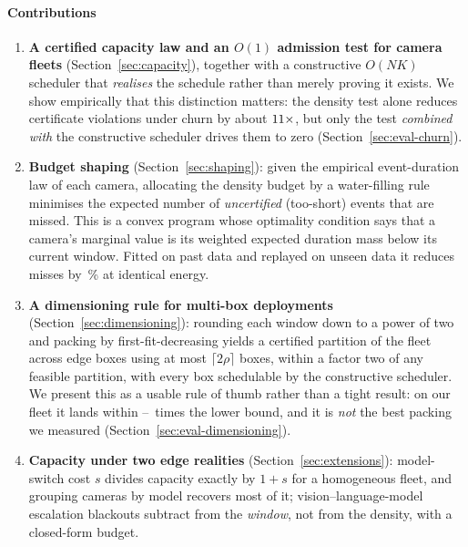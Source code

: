 \documentclass[preprint,review,12pt]{elsarticle}
\theoremstyle{definition}
\newcommand{\Nc}{N}
\newcommand{\dens}{\rho}
\begin{document}
\paragraph{Contributions}
\begin{enumerate}
\item \textbf{A certified capacity law and an $O(1)$ admission test for camera fleets}
      (Section~\ref{sec:capacity}), together with a constructive $O(\Nc K)$ scheduler that
      \emph{realises} the schedule rather than merely proving it exists. We show empirically that
      this distinction matters: the density test alone reduces certificate violations under churn
      by about $11\times$, but only the test \emph{combined with} the constructive
      scheduler drives them to zero (Section~\ref{sec:eval-churn}).
\item \textbf{Budget shaping} (Section~\ref{sec:shaping}): given the empirical event-duration law
      of each camera, allocating the density budget by a water-filling rule minimises the expected
      number of \emph{uncertified} (too-short) events that are missed. This is a convex program
      whose optimality condition says that a camera's marginal value is its weighted expected
      duration mass below its current window. Fitted on past data and replayed on unseen data it
      reduces misses by \numHoldoutGain\,\% at identical energy.
\item \textbf{A dimensioning rule for multi-box deployments} (Section~\ref{sec:dimensioning}):
      rounding each window down to a power of two and packing by first-fit-decreasing yields a
      certified partition of the fleet across edge boxes using at most $\lceil 2\dens\rceil$
      boxes, within a factor two of any feasible partition, with every box schedulable by the
      constructive scheduler. We present this as a usable rule of thumb rather than a tight
      result: on our fleet it lands within
      \numEfourCorThreeRatioMin--\numEfourCorThreeRatioMax\ times the lower bound, and it is
      \emph{not} the best packing we measured (Section~\ref{sec:eval-dimensioning}).
\item \textbf{Capacity under two edge realities} (Section~\ref{sec:extensions}): model-switch cost
      $s$ divides capacity exactly by $1+s$ for a homogeneous fleet, and grouping cameras by model
      recovers most of it; vision--language-model escalation blackouts subtract from the
      \emph{window}, not from the density, with a closed-form budget.
\end{enumerate}
\end{document}
